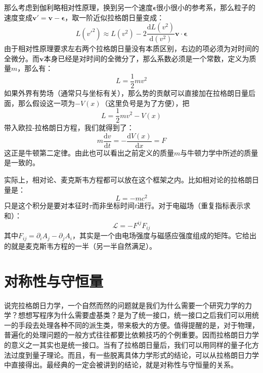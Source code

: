 \documentclass{ctexart}
\begin{document}
那么考虑到伽利略相对性原理，换到另一个速度$\bm{\epsilon}$很小很小的参考系，那么粒子的速度变成$\bm{v'}=\bm{v}-\bm{\epsilon}$，取一阶近似拉格朗日量变成：
\begin{equation}
L(v'^2)\approx L(v^2)-2\frac{\mathrm{d}L(v^2)}{\mathrm{d}(v^2)}\bm{v}\cdot\bm{\epsilon}
\end{equation}
由于相对性原理要求左右两个拉格朗日量没有本质区别，右边的项必须为对时间的全微分。而$\bm{v}$本身已经是对时间的全微分了，那么系数必须是一个常数，定义为质量$m$，那么有：
\begin{equation}
L=\frac{1}{2}mv^2
\end{equation}
如果外界有势场（通常只与坐标有关），那么势的贡献可以直接加在拉格朗日量后面，那么假设这一项为$-V(x)$（这里负号是为了方便），把
\begin{equation}
L=\frac{1}{2}mv^2-V(x)
\end{equation}
带入欧拉-拉格朗日方程，我们就得到了：
\begin{equation}
m\frac{\mathrm{d}v}{\mathrm{d}t}=-\frac{\mathrm{d}V(x)}{\mathrm{d}x}=F
\end{equation}
这正是牛顿第二定律。由此也可以看出之前定义的质量$m$与牛顿力学中所述的质量是一致的。

实际上，相对论、麦克斯韦方程都可以放在这个框架之内。比如相对论的拉格朗日量是：
\begin{equation}
L=-mc^2
\end{equation}
只是这个积分是要对本征时$\tau$而非坐标时间$t$进行。对于电磁场（重复指标表示求和）：
\begin{equation}
\mathcal{L}=-F^{ij}F_{ij}
\end{equation}
其中$F_{ij}=\partial_i A_j-\partial_j A_i$，其实是一个由电场强度与磁感应强度组成的矩阵。它给出的就是麦克斯韦方程的一半（另一半自然满足）。

\section{对称性与守恒量}

说完拉格朗日力学，一个自然而然的问题就是我们为什么需要一个研究力学的力学？想想写程序为什么需要虚基类？是为了统一接口，统一接口之后我们可以用统一的手段去处理各种不同的派生类，带来极大的方便。值得提醒的是，对于物理，普遍化的处理问题的一般方式往往都要比依赖技巧的个例重要。因而拉格朗日力学的意义之一其实也是统一接口。当有了拉格朗日量后，我们可以用同样的量子化方法过度到量子理论。而且，有一些脱离具体力学形式的结论，可以从拉格朗日力学中直接得出。最经典的一定会被讲到的结论，就是对称性与守恒量的关系。
\end{document}
